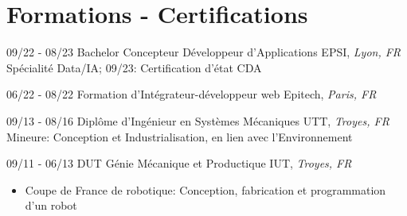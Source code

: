 \documentclass[]{friggeri-cv}
\begin{document}
\section{Formations - Certifications}
\vspace*{-0.25cm}
\vspace{0.5mm}
    \begin{entrylist}
    \entry
        {09/22 - 08/23}
        {Bachelor Concepteur Développeur d'Applications}
        {EPSI, \textit{Lyon, FR}}
        {Spécialité Data/IA; \hspace{7mm} 09/23: Certification d'état CDA}
    \end{entrylist}
    \vspace{0.5mm}
\begin{entrylist}
\entry
    {06/22 - 08/22}
    {Formation d'Intégrateur-développeur web}
    {Epitech, \textit{Paris, FR}}
    {}
\end{entrylist}
\vspace{0.5mm}
    \begin{entrylist}
    \entry
        {09/13 - 08/16}
        {Diplôme d'Ingénieur en Systèmes Mécaniques}
        {UTT, \textit{Troyes, FR}}
        {Mineure: Conception et Industrialisation, en lien avec l’Environnement}
    \end{entrylist}
    \vspace{0.5mm}
\begin{entrylist}
\entry
    {09/11 - 06/13}
    {DUT Génie Mécanique et Productique}
    {IUT, \textit{Troyes, FR}}
    {}
\end{entrylist}
\vspace*{-0.7cm}
\begin{itemize}
\setlength{\itemsep}{1pt}
\setlength{\parskip}{0pt}
\setlength{\parsep}{0pt}
\item Coupe de France de robotique: Conception, fabrication et programmation d’un robot
\end{itemize}
\end{document}
